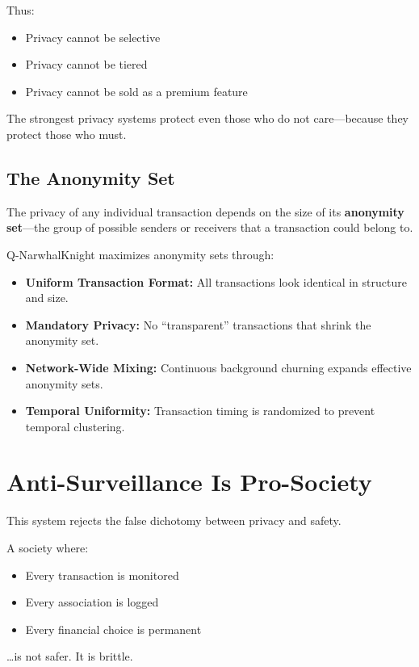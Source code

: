 \documentclass[12pt,a4paper]{article}
\begin{document}
Thus:
\begin{itemize}
    \item Privacy cannot be selective
    \item Privacy cannot be tiered
    \item Privacy cannot be sold as a premium feature
\end{itemize}

The strongest privacy systems protect even those who do not care---because they protect those who must.

\subsection{The Anonymity Set}

The privacy of any individual transaction depends on the size of its \textbf{anonymity set}---the group of possible senders or receivers that a transaction could belong to.

Q-NarwhalKnight maximizes anonymity sets through:

\begin{itemize}
    \item \textbf{Uniform Transaction Format:} All transactions look identical in structure and size.
    \item \textbf{Mandatory Privacy:} No ``transparent'' transactions that shrink the anonymity set.
    \item \textbf{Network-Wide Mixing:} Continuous background churning expands effective anonymity sets.
    \item \textbf{Temporal Uniformity:} Transaction timing is randomized to prevent temporal clustering.
\end{itemize}

\section{Anti-Surveillance Is Pro-Society}

This system rejects the false dichotomy between privacy and safety.

A society where:
\begin{itemize}
    \item Every transaction is monitored
    \item Every association is logged
    \item Every financial choice is permanent
\end{itemize}
\ldots is not safer. It is brittle.
\end{document}

